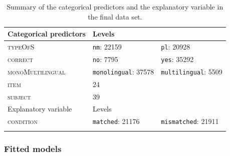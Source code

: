 \begin{table}\fontsize{10}{11}
\caption{Summary of the categorical predictors and the explanatory variable in the final data set.}
\label{tab:7.6}
\centering
\begin{tabular}{lllll} 
\lsptoprule
Categorical predictors & Levels & ~                               & ~ & ~                                     \\ 
\midrule
\textsc{typeOfS}                & \multicolumn{2}{l}{\texttt{nm}: 22159}            & \multicolumn{2}{l}{\texttt{pl}:
  20928}           \\
\textsc{correct}                & \multicolumn{2}{l}{\texttt{no}: 7795}             & \multicolumn{2}{l}{\texttt{yes}: 35292}            \\
\textsc{monoMultilingual}       & \multicolumn{2}{l}{\texttt{monolingual}:
  37578} & \multicolumn{2}{l}{\texttt{multilingual}:
  5509}  \\
\textsc{item}                   & 24     & ~                               & ~ & ~                                     \\
\textsc{subject}                & 39     & ~                               & ~ & ~                                     \\ 
\midrule
Explanatory variable   & Levels & ~                               & ~ & ~                                     \\ 
\midrule
\textsc{condition}              & \multicolumn{2}{l}{\texttt{matched}:
  21176}     & \multicolumn{2}{l}{\texttt{mismatched}:
  21911}   \\
\lspbottomrule
\end{tabular}
\end{table}

\subsubsection{Fitted models}\label{section07_2_2_2}

